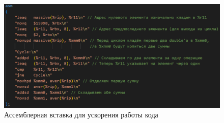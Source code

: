 \documentclass[a4paper,12pt]{article}
\begin{document}
\begin{figure}[H]\label{fig: Asm optimization code}
    \centering
    \includegraphics[width = \textwidth]{Average_optimized_Asm код.png}
    \caption{Ассемблерная вставка для ускорения работы кода}
\end{figure}
\end{document}
